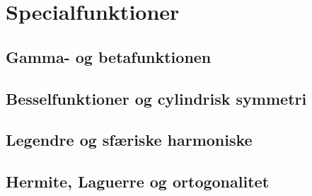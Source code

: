 \chapter{Specialfunktioner}
\section{Gamma- og betafunktionen}
\leavevmode\par

\section{Besselfunktioner og cylindrisk symmetri}
\leavevmode\par

\section{Legendre og sfæriske harmoniske}
\leavevmode\par

\section{Hermite, Laguerre og ortogonalitet}
\leavevmode\par
